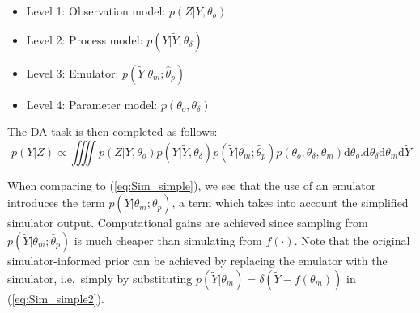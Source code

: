 \documentclass[10pt,a4paper]{article}
\newcommand{\intd} {\textrm{d}}
\begin{document}
\begin{itemize}
\item Level 1: Observation model: $p(Z | Y, \theta_o)$
\item Level 2: Process model: $p(Y | \widetilde{Y}, \theta_\delta)$
\item Level 3: Emulator: $p(\widetilde{Y} | \theta_m; \hat\theta_p)$
\item Level 4: Parameter model: $p(\theta_o,\theta_\delta)$
\end{itemize}

The DA task is then completed as follows:
\begin{equation}\label{eq:Sim_simple2}
p(Y|Z) \propto \iiiint p(Z | Y, \theta_o)p(Y | \widetilde{Y},\theta_\delta)p(\widetilde{Y} | \theta_m; \hat\theta_p)p(\theta_o, \theta_\delta, \theta_m) \intd\theta_o. \intd\theta_\delta\intd\theta_m\intd\widetilde{Y}
\end{equation}


\noindent When comparing to (\ref{eq:Sim_simple}), we see that the use of an emulator introduces the term $p(\widetilde{Y} | \theta_m; \theta_p)$, a term which takes into account the simplified simulator output. Computational gains are achieved since sampling from $p(\widetilde{Y} | \theta_m; \hat\theta_p)$ is much cheaper than simulating from $f(\cdot)$. Note that the original simulator-informed prior can be achieved by replacing the emulator with the simulator, i.e.~simply by substituting $p(\widetilde{Y} | \theta_m) = \delta(\widetilde{Y} - f(\theta_m))$ in (\ref{eq:Sim_simple2}).
%
%
\end{document}
